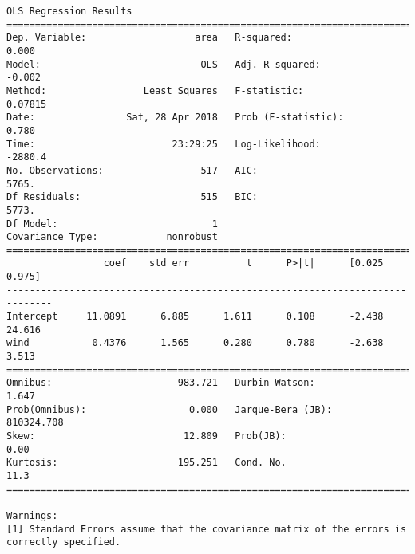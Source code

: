 \documentclass[11pt]{article}
\begin{document}
\begin{Verbatim}[commandchars=\\\{\}]
                            OLS Regression Results                            
==============================================================================
Dep. Variable:                   area   R-squared:                       0.000
Model:                            OLS   Adj. R-squared:                 -0.002
Method:                 Least Squares   F-statistic:                   0.07815
Date:                Sat, 28 Apr 2018   Prob (F-statistic):              0.780
Time:                        23:29:25   Log-Likelihood:                -2880.4
No. Observations:                 517   AIC:                             5765.
Df Residuals:                     515   BIC:                             5773.
Df Model:                           1                                         
Covariance Type:            nonrobust                                         
==============================================================================
                 coef    std err          t      P>|t|      [0.025      0.975]
------------------------------------------------------------------------------
Intercept     11.0891      6.885      1.611      0.108      -2.438      24.616
wind           0.4376      1.565      0.280      0.780      -2.638       3.513
==============================================================================
Omnibus:                      983.721   Durbin-Watson:                   1.647
Prob(Omnibus):                  0.000   Jarque-Bera (JB):           810324.708
Skew:                          12.809   Prob(JB):                         0.00
Kurtosis:                     195.251   Cond. No.                         11.3
==============================================================================

Warnings:
[1] Standard Errors assume that the covariance matrix of the errors is correctly specified.



\end{Verbatim}
\end{document}

